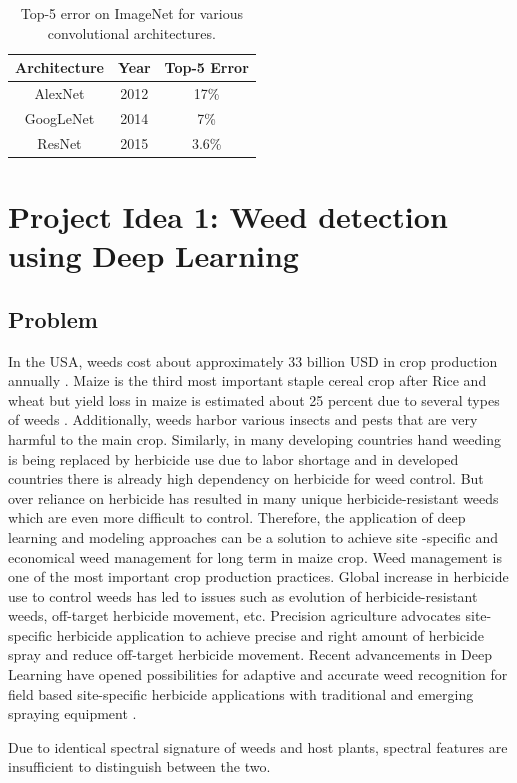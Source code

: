 \documentclass{report}
\begin{document}
\begin{table}[]
    \centering \caption{Top-5 error on ImageNet for various convolutional architectures.}
    \begin{tabular}{|c|c|c|} \hline
      Architecture   &  Year & Top-5 Error \\ \hline
    AlexNet & 2012     & 17\% \\
    GoogLeNet & 2014 & 7\% \\
    ResNet & 2015 & 3.6\% \\ \hline
    \end{tabular}
 
    \label{tab:CNN-perf}
\end{table}
\fi
\section{Project Idea 1: Weed detection using Deep Learning }
\subsection{Problem}
In the USA, weeds cost about approximately 33 billion USD in  crop production annually \cite{4}. Maize is the third most important staple cereal crop after Rice and wheat but yield loss in maize is estimated about 25 percent due to several types of weeds \cite{2}. Additionally, weeds harbor various insects and pests that are very harmful to the main crop. Similarly, in many developing countries hand weeding is being replaced by herbicide use due to labor shortage and in developed countries there is already high dependency on herbicide for weed control. But over reliance on herbicide has resulted in many unique herbicide-resistant weeds which are even more difficult to control. Therefore, the application of deep learning and modeling approaches can be a solution to achieve site -specific and economical weed management for long term in maize crop.
 Weed management is one of the most important crop production practices. Global increase in herbicide use to control weeds has led to issues such as evolution of herbicide-resistant weeds, off-target herbicide movement, etc. Precision agriculture advocates site-specific herbicide application to achieve precise and right amount of herbicide spray and reduce off-target herbicide movement. Recent advancements in Deep Learning have opened possibilities for adaptive and accurate weed recognition for field based site-specific herbicide applications with traditional and emerging spraying equipment \cite{1}.\par
Due to identical spectral signature of weeds and host plants, spectral features are insufficient to distinguish between the two. 
\end{document}
